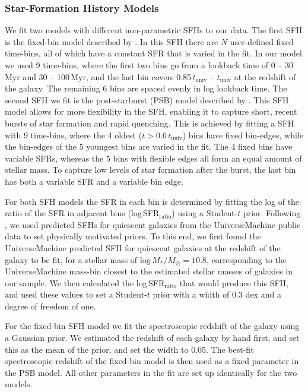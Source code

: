 \documentclass[twocolumn, astrosymb]{aastex631}
\begin{document}
\subsubsection{Star-Formation History Models}
We fit two models with different non-parametric SFHs to our data. The first SFH is the fixed-bin model described by \citet{JLeja2019_b}. In this SFH there are $N$ user-defined fixed time-bins, all of which have a constant SFR that is varied in the fit. In our model we used 9 time-bins, where the first two bins go from a lookback time of 0 -- 30\,Myr and 30 -- 100\,Myr, and the last bin covers 0.85\,$t_{\text{univ}}$ -- $t_{\text{univ}}$ at the redshift of the galaxy. The remaining 6 bins are spaced evenly in log lookback time. The second SFH we fit is the post-starburst (PSB) model described by \citet{KSuess2022a}. This SFH model allows for more flexibility in the SFH, enabling it to capture short, recent bursts of star formation and rapid quenching. This is achieved by fitting a SFH with 9 time-bins, where the 4 oldest ($t > 0.6\,t_{\text{univ}}$) bins have fixed bin-edges, while the bin-edges of the 5 youngest bins are varied in the fit. The 4 fixed bins have variable SFRs, whereas the 5 bins with flexible edges all form an equal amount of stellar mass. To capture low levels of star formation after the burst, the last bin has both a variable SFR and a variable bin edge.

For both SFH models the SFR in each bin is determined by fitting the log of the ratio of the SFR in adjacent bins (log\,SFR$_{\text{ratio}}$) using a Student-$t$ prior. Following \citet{KSuess2022b}, we used predicted SFHs for quiescent galaxies from the UniverseMachine public data \citep{PBehroozi2019} to set physically motivated priors. To this end, we first found the UniverseMachine predicted SFH for quiescent galaxies at the redshift of the galaxy to be fit, for a stellar mass of log\,$M_{*}/M_{\odot} = 10.8$, corresponding to the UniverseMachine mass-bin closest to the estimated stellar masses of galaxies in our sample. We then calculated the log\,SFR$_{\text{ratio}}$ that would produce this SFH, and used these values to set a Student-$t$ prior with a width of 0.3 dex and a degree of freedom of one.

For the fixed-bin SFH model we fit the spectroscopic redshift of the galaxy using a Gaussian prior. We estimated the redshift of each galaxy by hand first, and set this as the mean of the prior, and set the width to 0.05. The best-fit spectroscopic redshift of the fixed-bin model is then used as a fixed parameter in the PSB model. All other parameters in the fit are set up identically for the two models.
\end{document}
